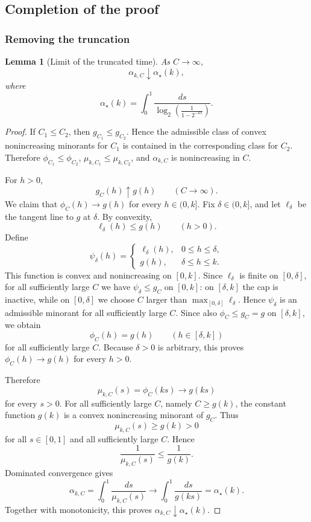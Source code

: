 \documentclass[11pt]{article}
\newtheorem{lemma}{Lemma}
\begin{document}
	

\subsection{Completion of the proof}\label{sec:completion}

\subsubsection{Removing the truncation}
	
	\begin{lemma}[Limit of the truncated time]
		As \(C\to\infty\),
		\[
		\alpha_{k,C}
		\downarrow
		\alpha_\star(k),
		\]
		where
		\[
		\alpha_\star(k)
		=
		\int_0^1
		\frac{ds}{
			\log_2\left(\frac1{1-2^{-ks}}\right)
		}.
		\]
	\end{lemma}
	
	\begin{proof}
		If \(C_1\le C_2\), then \(g_{C_1}\le g_{C_2}\). Hence the admissible
		class of convex nonincreasing minorants for \(C_1\) is contained in the
		corresponding class for \(C_2\). Therefore \(\phi_{C_1}\le\phi_{C_2}\),
		\(\mu_{k,C_1}\le\mu_{k,C_2}\), and \(\alpha_{k,C}\) is nonincreasing in
		\(C\).
		
		For \(h>0\),
		\[
		g_C(h)\uparrow g(h)
		\qquad (C\to\infty).
		\]
		We claim that \(\phi_C(h)\to g(h)\) for every \(h\in(0,k]\). Fix
		\(\delta\in(0,k]\), and let \(\ell_\delta\) be the tangent line to \(g\) at
		\(\delta\). By convexity,
		\[
		\ell_\delta(h)\le g(h)
		\qquad (h>0).
		\]
		Define
		\[
		\psi_\delta(h)=
		\begin{cases}
		\ell_\delta(h), & 0\le h\le\delta,\\
		g(h), & \delta\le h\le k.
		\end{cases}
		\]
		This function is convex and nonincreasing on \([0,k]\). Since
		\(\ell_\delta\) is finite on \([0,\delta]\), for all sufficiently large
		\(C\) we have \(\psi_\delta\le g_C\) on \([0,k]\): on \([\delta,k]\) the
		cap is inactive, while on \([0,\delta]\) we choose \(C\) larger than
		\(\max_{[0,\delta]}\ell_\delta\). Hence \(\psi_\delta\) is an admissible
		minorant for all sufficiently large \(C\). Since also \(\phi_C\le g_C=g\)
		on \([\delta,k]\), we obtain
		\[
		\phi_C(h)=g(h)
		\qquad (h\in[\delta,k])
		\]
		for all sufficiently large \(C\). Because \(\delta>0\) is arbitrary, this
		proves \(\phi_C(h)\to g(h)\) for every \(h>0\).
		
		Therefore
		\[
		\mu_{k,C}(s)=\phi_C(ks)
		\to
		g(ks)
		\]
		for every \(s>0\). For all sufficiently large \(C\), namely \(C\ge g(k)\),
		the constant function \(g(k)\) is a convex nonincreasing minorant of
		\(g_C\). Thus
		\[
		\mu_{k,C}(s)\ge g(k)>0
		\]
		for all \(s\in[0,1]\) and all sufficiently large \(C\). Hence
		\[
		\frac1{\mu_{k,C}(s)}
		\le
		\frac1{g(k)}.
		\]
		Dominated convergence gives
		\[
		\alpha_{k,C}
		=
		\int_0^1\frac{ds}{\mu_{k,C}(s)}
		\to
		\int_0^1
		\frac{ds}{g(ks)}
		=
		\alpha_\star(k).
		\]
		Together with monotonicity, this proves \(\alpha_{k,C}\downarrow
		\alpha_\star(k)\).
	\end{proof}
	
\end{document}
